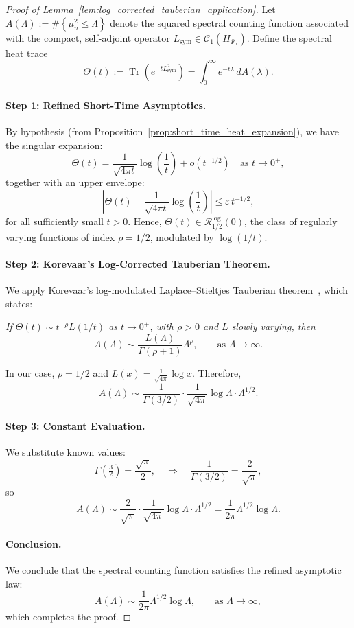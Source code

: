 \begin{proof}[Proof of Lemma~\ref{lem:log_corrected_tauberian_application}]
Let \( A(\Lambda) := \#\left\{ \mu_n^2 \le \Lambda \right\} \) denote the squared spectral counting function associated with the compact, self-adjoint operator \( L_{\mathrm{sym}} \in \mathcal{C}_1(H_{\Psi_\alpha}) \). Define the spectral heat trace
\[
\Theta(t) := \operatorname{Tr}(e^{-t L_{\mathrm{sym}}^2}) = \int_0^\infty e^{-t \lambda} \, dA(\lambda).
\]

\paragraph{Step 1: Refined Short-Time Asymptotics.}
By hypothesis (from Proposition~\ref{prop:short_time_heat_expansion}), we have the singular expansion:
\[
\Theta(t) = \frac{1}{\sqrt{4\pi t}} \log\left( \frac{1}{t} \right) + o(t^{-1/2}) \quad \text{as } t \to 0^+,
\]
together with an upper envelope:
\[
\left| \Theta(t) - \frac{1}{\sqrt{4\pi t}} \log\left( \frac{1}{t} \right) \right| \leq \varepsilon \, t^{-1/2},
\]
for all sufficiently small \( t > 0 \). Hence, \( \Theta(t) \in \mathcal{R}_{1/2}^{\log}(0) \), the class of regularly varying functions of index \( \rho = 1/2 \), modulated by \( \log(1/t) \).

\paragraph{Step 2: Korevaar's Log-Corrected Tauberian Theorem.}
We apply Korevaar’s log-modulated Laplace–Stieltjes Tauberian theorem~\cite[Ch.~III, §5, Thm.~5.5]{Korevaar2004Tauberian}, which states:

\medskip
\emph{If \( \Theta(t) \sim t^{-\rho} L(1/t) \) as \( t \to 0^+ \), with \( \rho > 0 \) and \( L \) slowly varying, then}
\[
A(\Lambda) \sim \frac{L(\Lambda)}{\Gamma(\rho+1)} \Lambda^{\rho}, \qquad \text{as } \Lambda \to \infty.
\]

\medskip
In our case, \( \rho = 1/2 \) and \( L(x) = \frac{1}{\sqrt{4\pi}} \log x \). Therefore,
\[
A(\Lambda) \sim \frac{1}{\Gamma(3/2)} \cdot \frac{1}{\sqrt{4\pi}} \log \Lambda \cdot \Lambda^{1/2}.
\]

\paragraph{Step 3: Constant Evaluation.}
We substitute known values:
\[
\Gamma\left( \tfrac{3}{2} \right) = \frac{\sqrt{\pi}}{2}, \quad \Rightarrow \quad \frac{1}{\Gamma(3/2)} = \frac{2}{\sqrt{\pi}},
\]
so
\[
A(\Lambda) \sim \frac{2}{\sqrt{\pi}} \cdot \frac{1}{\sqrt{4\pi}} \log \Lambda \cdot \Lambda^{1/2}
= \frac{1}{2\pi} \Lambda^{1/2} \log \Lambda.
\]

\paragraph{Conclusion.}
We conclude that the spectral counting function satisfies the refined asymptotic law:
\[
A(\Lambda) \sim \frac{1}{2\pi} \Lambda^{1/2} \log \Lambda, \qquad \text{as } \Lambda \to \infty,
\]
which completes the proof.
\end{proof}

